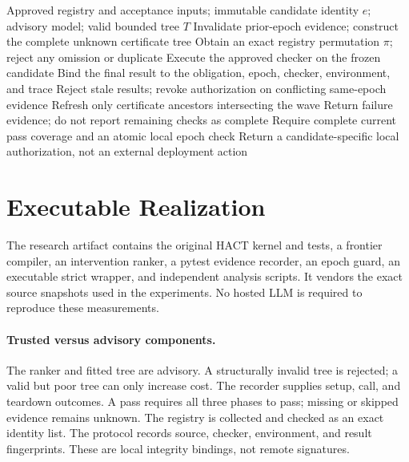 \documentclass[11pt]{article}
\theoremstyle{definition}\newtheorem{definition}[theorem]{Definition}
\theoremstyle{remark}\newtheorem{remark}[theorem]{Remark}
\begin{document}
\begin{algorithm}[t]
\caption{IC-HACT strict candidate verification}\label{alg:runtime}
\begin{algorithmic}[1]
\Require Approved registry and acceptance inputs; immutable candidate identity $e$; advisory model; valid bounded tree $T$
\State Invalidate prior-epoch evidence; construct the complete unknown certificate tree
\State Obtain an exact registry permutation $\pi$; reject any omission or duplicate
  \State Execute the approved checker on the frozen candidate
  \State Bind the final result to the obligation, epoch, checker, environment, and trace
  \State Reject stale results; revoke authorization on conflicting same-epoch evidence
    \State Refresh only certificate ancestors intersecting the wave
  \EndIf
  \State Return failure evidence; do not report remaining checks as complete\EndIf
\EndFor
\State Require complete current pass coverage and an atomic local epoch check
\State Return a candidate-specific local authorization, not an external deployment action
\end{algorithmic}
\end{algorithm}

\section{Executable Realization}
The research artifact contains the original HACT kernel and tests, a frontier compiler, an intervention ranker, a pytest evidence recorder, an epoch guard, an executable strict wrapper, and independent analysis scripts. It vendors the exact source snapshots used in the experiments. No hosted LLM is required to reproduce these measurements.

\paragraph{Trusted versus advisory components.}
The ranker and fitted tree are advisory. A structurally invalid tree is rejected; a valid but poor tree can only increase cost. The recorder supplies setup, call, and teardown outcomes. A pass requires all three phases to pass; missing or skipped evidence remains unknown. The registry is collected and checked as an exact identity list. The protocol records source, checker, environment, and result fingerprints. These are local integrity bindings, not remote signatures.
\end{document}
